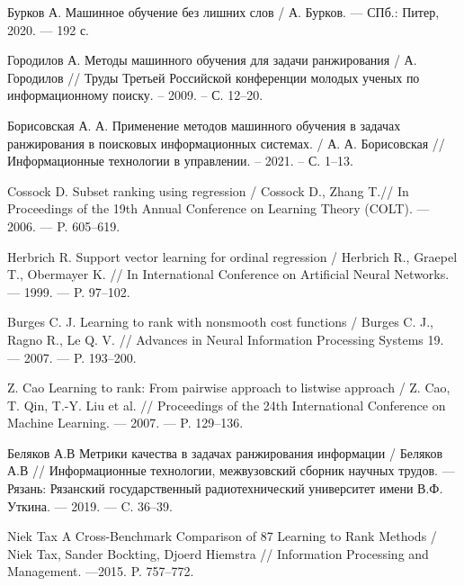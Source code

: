 
\renewcommand\bibname{СПИСОК ИСПОЛЬЗОВАННЫХ ИСТОЧНИКОВ}
\begin{thebibliography}{}

 Бурков А. Машинное обучение без лишних слов / А. Бурков. --- СПб.: Питер, 2020. --- 192 с.

 Городилов А. Методы машинного обучения для задачи ранжирования / А. Городилов // Труды Третьей Российской конференции молодых ученых по информационному поиску. – 2009. – С. 12--20.

 Борисовская А. А. Применение методов машинного обучения в задачах ранжирования в поисковых информационных системах. / А. А. Борисовская // Информационные технологии в управлении. – 2021. – С. 1--13.

 Cossock D. Subset ranking using regression / Cossock D., Zhang T.// In Proceedings of the 19th Annual Conference on Learning Theory (COLT). --- 2006. --- P. 605–619.

 Herbrich R. Support vector learning for ordinal regression / Herbrich R., Graepel T., Obermayer K. // In International Conference on Artificial Neural Networks. --- 1999. ---
P. 97--102.

 Burges C. J. Learning to rank with nonsmooth cost functions / Burges C. J., Ragno R., Le Q. V. // Advances in Neural Information Processing Systems 19. --- 2007. --- P. 193--200.

 Z. Cao Learning to rank: From pairwise approach to listwise approach / Z. Cao, T. Qin,
T.-Y. Liu et al. // Proceedings of the 24th International Conference on Machine Learning. --- 2007. --- P. 129--136.

 Беляков А.В Метрики качества в задачах ранжирования информации / Беляков А.В // Информационные технологии, межвузовский сборник научных трудов. --- Рязань: Рязанский государственный радиотехнический университет имени В.Ф. Уткина. --- 2019. --- C. 36--39.

 Niek Tax A Cross-Benchmark Comparison of 87 Learning to Rank Methods / Niek Tax, Sander Bockting, Djoerd Hiemstra // Information Processing and Management. ---2015. P. 757--772.

\end{thebibliography}


